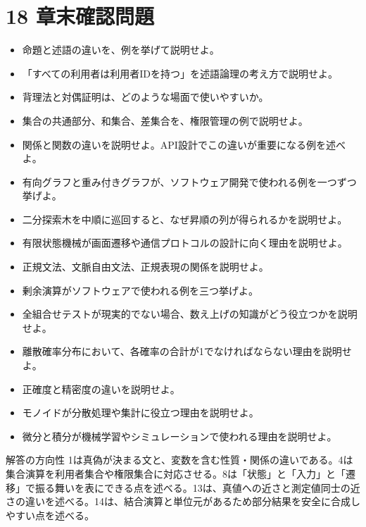 \documentclass[uplatex,dvipdfmx,a4paper,10pt]{jsarticle}
\begin{document}
\section{18 章末確認問題}
\begin{itemize}[leftmargin=2zw]
\item 命題と述語の違いを、例を挙げて説明せよ。
\item 「すべての利用者は利用者IDを持つ」を述語論理の考え方で説明せよ。
\item 背理法と対偶証明は、どのような場面で使いやすいか。
\item 集合の共通部分、和集合、差集合を、権限管理の例で説明せよ。
\item 関係と関数の違いを説明せよ。API設計でこの違いが重要になる例を述べよ。
\item 有向グラフと重み付きグラフが、ソフトウェア開発で使われる例を一つずつ挙げよ。
\item 二分探索木を中順に巡回すると、なぜ昇順の列が得られるかを説明せよ。
\item 有限状態機械が画面遷移や通信プロトコルの設計に向く理由を説明せよ。
\item 正規文法、文脈自由文法、正規表現の関係を説明せよ。
\item 剰余演算がソフトウェアで使われる例を三つ挙げよ。
\item 全組合せテストが現実的でない場合、数え上げの知識がどう役立つかを説明せよ。
\item 離散確率分布において、各確率の合計が1でなければならない理由を説明せよ。
\item 正確度と精密度の違いを説明せよ。
\item モノイドが分散処理や集計に役立つ理由を説明せよ。
\item 微分と積分が機械学習やシミュレーションで使われる理由を説明せよ。
\end{itemize}
\begin{infobox}{解答の方向性}
1は真偽が決まる文と、変数を含む性質・関係の違いである。4は集合演算を利用者集合や権限集合に対応させる。8は「状態」と「入力」と「遷移」で振る舞いを表にできる点を述べる。13は、真値への近さと測定値同士の近さの違いを述べる。14は、結合演算と単位元があるため部分結果を安全に合成しやすい点を述べる。
\end{infobox}
\end{document}
